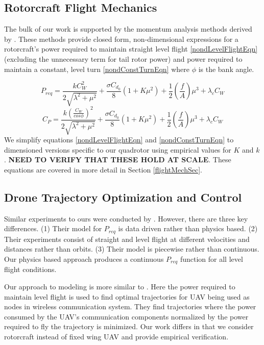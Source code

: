 
\subsection{Rotorcraft Flight Mechanics}
The bulk of our work is supported by the momentum analysis methods derived by \cite{leishman2006principles}. These methods provide closed form, non-dimensional expressions for a rotorcraft's power required to maintain straight level flight \eqref{nondLevelFlightEqn} (excluding the unnecessary term for tail rotor power) and power required to maintain a constant, level turn \eqref{nondConstTurnEqn} where $\phi$ is the bank angle.

\begin{equation}
    \label{nondLevelFlightEqn}
    P_{req} = \frac{k C_W^2}{2\sqrt{\lambda^2+\mu^2}}+\frac{\sigma C_{d_0}}{8}(1+K \mu^2)+\frac{1}{2}(\frac{f}{A})\mu^3+\lambda_c C_W
\end{equation}
\begin{equation}
    \label{nondConstTurnEqn}
    C_P = \frac{k(\frac{C_W}{cos\phi})^2}{2\sqrt{\lambda^2+\mu^2}}+\frac{\sigma C_{d_0}}{8}(1+K \mu^2)+\frac{1}{2}(\frac{f}{A})\mu^3+\lambda_c C_W
\end{equation}
We simplify equations \ref{nondLevelFlightEqn} and \ref{nondConstTurnEqn} to dimensioned versions specific to our quadrotor using empirical values for $K$ and $k$. \textbf{NEED TO VERIFY THAT THESE HOLD AT SCALE}. These equations are covered in more detail in Section \ref{flightMechSec}.

\subsection{Drone Trajectory Optimization and Control}
Similar experiments to ours were conducted by \cite{di2015energy}. However, there are three key differences. (1) Their model for $P_{req}$ is data driven rather than physics based. (2) Their experiments consist of straight and level flight at different velocities and distances rather than orbits. (3) Their model is piecewise rather than continuous. Our physics based approach produces a continuous $P_{req}$ function for all level flight conditions. 

Our approach to modeling is more similar to \cite{zeng2017energy}. Here the power required to maintain level flight is used to find optimal trajectories for UAV being used as nodes in wireless communication system. They find trajectories where the power consumed by the UAV's communication components normalized by the power required to fly the trajectory is minimized. Our work differs in that we consider rotorcraft instead of fixed wing UAV and provide empirical verification.

